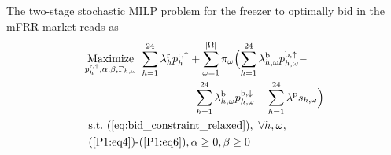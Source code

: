 \documentclass[11pt,a4paper]{article}
\begin{document}
\begingroup
\allowdisplaybreaks
The two-stage stochastic MILP problem for the freezer to optimally bid in the mFRR market reads as
%
\begin{subequations}\label{P2:FinalModel}
    \begin{align}
           & \underset{p_{h}^{\rm{r},\uparrow}, \alpha, \beta, \Gamma_{h,\omega}}{\text{Maximize}} \ \sum_{h=1}^{24}\lambda_{h}^{\rm{r}} p^{\rm{r}, \uparrow}_{h}+ \sum_{\omega=1}^{|\Omega|} \pi_{\omega}  \Bigl(\sum_{h=1}^{24}  \lambda_{h,\omega}^{\rm{b}} p^{\rm{b},\uparrow}_{h,\omega} - \notag                                                                                                                                                                                                                                                            \\  &  \hspace{3.5cm}\sum_{h=1}^{24}  \lambda_{h,\omega}^{\rm{b}} p^{\rm{b},\downarrow}_{h,\omega} - \sum_{h=1}^{24}  \lambda^{\rm{p}}s_{h,\omega} \Bigr) \label{P2:1} \\
           & \   \text{s.t.}  \  (\ref{eq:bid_constraint_relaxed}), \ \forall{h,\omega},   \label{P2:2}                                                                                                                                                                                                                                                                                                                                                                                                                                                           \\
           & \                                               \text{(\ref{P1:eq4})-(\ref{P1:eq6})}, \alpha \geq 0,   \beta \geq 0 \    \label{P2:3}                                                                                                                                                                                                                                                                                                                                                                                                                \\

\end{align}
\end{subequations}
\end{document}
